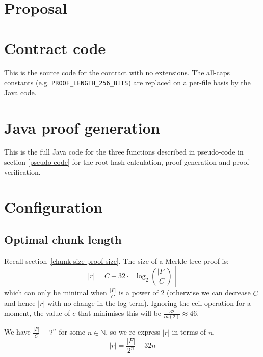 \documentclass[12pt,a4paper,twoside,openright]{report}
\begin{document}
\begin{appendices}

\chapter{Proposal}




\chapter{Contract code} \label{app-contract}

This is the source code for the contract with no extensions.
The all-caps constants (e.g. \texttt{PROOF\_LENGTH\_256\_BITS})
are replaced on a per-file basis by the Java code.



\chapter{Java proof generation} \label{app-java}

This is the full Java code for the three functions described in pseudo-code in section \ref{pseudo-code}
for the root hash calculation, proof generation and proof verification.




\chapter{Configuration}

\section{Optimal chunk length} \label{app-chunk-size}

Recall section~\ref{chunk-size-proof-size}.
The size of a Merkle tree proof is:
\[|r| = C + 32 \cdot \left\lceil\log_2\left(\frac{|F|}{C}\right)\right\rceil\]
which can only be minimal when $\frac{|F|}{C}$ is a power of 2 (otherwise we can decrease $C$ and hence $|r|$ with no change in the log term).
Ignoring the ceil operation for a moment, the value of $c$ that minimises this will be $\frac{32}{ln(2)} \approx 46$.

We have $\frac{|F|}{C} = 2^n$ for some $n \in \mathbb{N}$, so we re-express $|r|$ in terms of $n$.
\[|r| = \frac{|F|}{2^n} + 32 n\]


\end{appendices}
\end{document}
